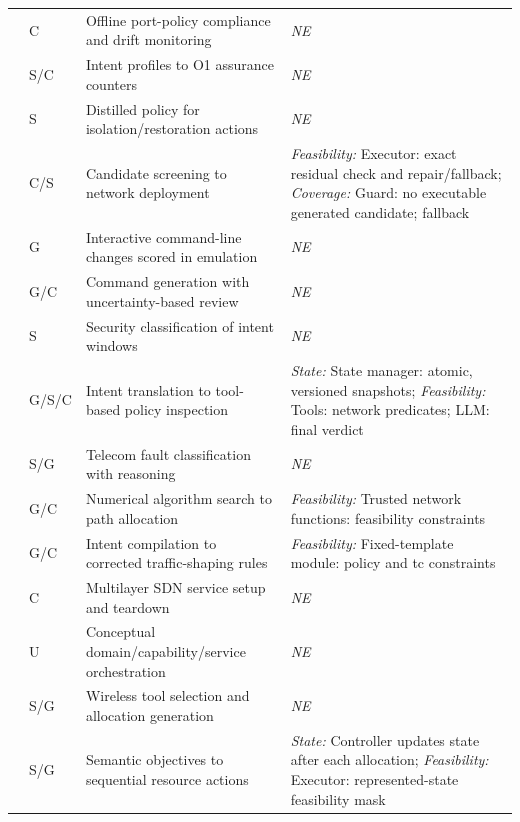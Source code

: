 \begin{longtable}{>{\raggedright\arraybackslash}p{.09\soklitwidth}>{\centering\arraybackslash}p{.07\soklitwidth}>{\raggedright\arraybackslash}p{.36\soklitwidth}>{\raggedright\arraybackslash}p{.48\soklitwidth}}
\addlinespace[1pt]
\cite{e0arxiv260605076} & C & Offline port-policy compliance and drift monitoring & \textit{NE} \\
\addlinespace[1pt]
\cite{e0arxiv260708809} & S/C & Intent profiles to O1 assurance counters & \textit{NE} \\
\addlinespace[1pt]
\cite{e0arxiv260728826} & S & Distilled policy for isolation/restoration actions & \textit{NE} \\
\addlinespace[1pt]
\cite{e0arxiv260800908} & C/S & Candidate screening to network deployment & \emph{Feasibility:} Executor: exact residual check and repair/fallback; \emph{Coverage:} Guard: no executable generated candidate; fallback \\
\addlinespace[1pt]
\cite{e0arxiv260823179} & G & Interactive command-line changes scored in emulation & \textit{NE} \\
\addlinespace[1pt]
\cite{e0arxiv260904486} & G/C & Command generation with uncertainty-based review & \textit{NE} \\
\addlinespace[1pt]
\cite{e0arxiv260912144} & S & Security classification of intent windows & \textit{NE} \\
\addlinespace[1pt]
\cite{e0arxiv260921103} & G/S/C & Intent translation to tool-based policy inspection & \emph{State:} State manager: atomic, versioned snapshots; \emph{Feasibility:} Tools: network predicates; LLM: final verdict \\
\addlinespace[1pt]
\cite{e0arxiv260925356} & S/G & Telecom fault classification with reasoning & \textit{NE} \\
\addlinespace[1pt]
\cite{e0arxiv260927386} & G/C & Numerical algorithm search to path allocation & \emph{Feasibility:} Trusted network functions: feasibility constraints \\
\addlinespace[1pt]
\cite{e0arxiv260931397} & G/C & Intent compilation to corrected traffic-shaping rules & \emph{Feasibility:} Fixed-template module: policy and tc constraints \\
\addlinespace[1pt]
\cite{e0arxiv180303106} & C & Multilayer SDN service setup and teardown & \textit{NE} \\
\addlinespace[1pt]
\cite{e0arxiv200807162} & U & Conceptual domain/capability/service orchestration & \textit{NE} \\
\addlinespace[1pt]
\cite{e0arxiv241210107} & S/G & Wireless tool selection and allocation generation & \textit{NE} \\
\addlinespace[1pt]
\cite{e0arxiv250216198} & S/G & Semantic objectives to sequential resource actions & \emph{State:} Controller updates state after each allocation; \emph{Feasibility:} Executor: represented-state feasibility mask \\

\end{longtable}
